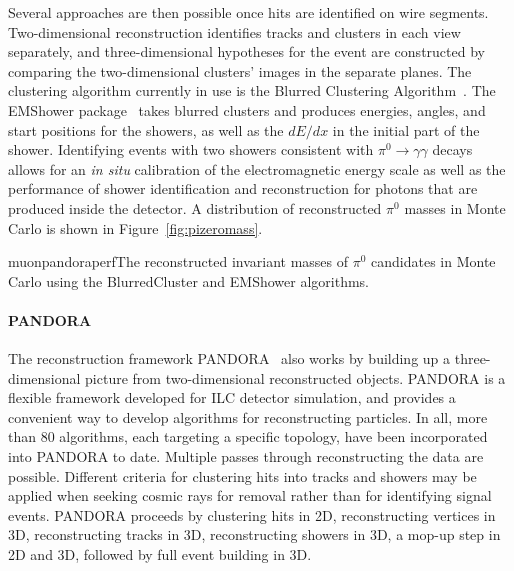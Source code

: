 Several approaches are then possible once hits are identified on wire
segments.  Two-dimensional reconstruction identifies tracks and
clusters in each view separately, and three-dimensional hypotheses for
the event are constructed by comparing the two-dimensional clusters'
images in the separate planes.  The clustering algorithm currently in
use is the Blurred Clustering Algorithm~\cite{blurredclustering}.  The
EMShower package~\cite{emshowerpackage} takes blurred clusters and
produces energies, angles, and start positions for the showers, as
well as the $dE/dx$ in the initial part of the shower.  Identifying
events with two showers consistent with $\pi^0\rightarrow\gamma\gamma$
decays allows for an {\it in situ} calibration of the electromagnetic
energy scale as well as the performance of shower identification and
reconstruction for photons that are produced inside the detector.  A
distribution of reconstructed $\pi^0$ masses in Monte Carlo is shown
in Figure~\ref{fig:pizeromass}.

\begin{cdrfigure}{muonpandoraperf}{The reconstructed invariant masses of $\pi^0$ candidates in
  Monte Carlo using the BlurredCluster and EMShower algorithms.}
\end{cdrfigure}


\paragraph{PANDORA}
The reconstruction framework PANDORA~\cite{pandora} also works by
building up a three-dimensional picture from two-dimensional
reconstructed objects.  PANDORA is a flexible framework developed for
ILC detector simulation, and provides a convenient way to develop
algorithms for reconstructing particles.  In all, more than 80
algorithms, each targeting a specific topology, have been incorporated
into PANDORA to date.  Multiple passes through reconstructing the data
are possible.  Different criteria for clustering hits into tracks and
showers may be applied when seeking cosmic rays for removal rather than for
identifying signal events.  PANDORA proceeds by clustering hits in 2D,
reconstructing vertices in 3D, reconstructing tracks in 3D,
reconstructing showers in 3D, a mop-up step in 2D and 3D, followed by
full event building in 3D.

